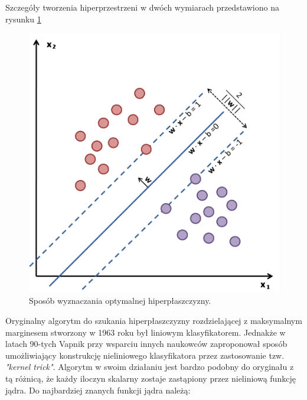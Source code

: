 Szczegóły tworzenia hiperprzestrzeni w dwóch wymiarach przedstawiono na rysunku \ref{im: SvmMargin}
\begin{figure}[h]
	\includegraphics[width=12cm]{SvmMargin}
	\centering
	\caption{Sposób wyznaczania optymalnej hiperpłaszczyzny.}
	\label{im: SvmMargin}
\end{figure}

Oryginalny algorytm do szukania hiperpłaszczyzny rozdzielającej z maksymalnym marginesem stworzony w 1963 roku był liniowym klasyfikatorem. Jednakże w latach 90-tych Vapnik przy wsparciu innych naukowców zaproponował sposób umożliwiający konstrukcję nieliniowego klasyfikatora przez zastosowanie tzw. \textit{"kernel trick"}. Algorytm w swoim działaniu jest bardzo podobny do oryginału z tą różnicą, że każdy iloczyn skalarny zostaje zastąpiony przez nieliniową funkcję jądra. Do najbardziej znanych funkcji jądra należą:

